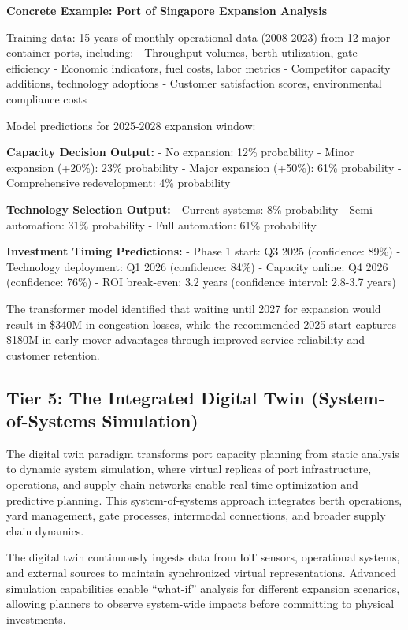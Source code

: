 \documentclass{article}
\begin{document}
\textbf{Concrete Example: Port of Singapore Expansion Analysis}

Training data: 15 years of monthly operational data (2008-2023) from 12 major container ports, including:
- Throughput volumes, berth utilization, gate efficiency
- Economic indicators, fuel costs, labor metrics  
- Competitor capacity additions, technology adoptions
- Customer satisfaction scores, environmental compliance costs

Model predictions for 2025-2028 expansion window:

\textbf{Capacity Decision Output:}
- No expansion: 12\% probability
- Minor expansion (+20\%): 23\% probability  
- Major expansion (+50\%): 61\% probability
- Comprehensive redevelopment: 4\% probability

\textbf{Technology Selection Output:}
- Current systems: 8\% probability
- Semi-automation: 31\% probability
- Full automation: 61\% probability

\textbf{Investment Timing Predictions:}
- Phase 1 start: Q3 2025 (confidence: 89\%)
- Technology deployment: Q1 2026 (confidence: 84\%)
- Capacity online: Q4 2026 (confidence: 76\%)
- ROI break-even: 3.2 years (confidence interval: 2.8-3.7 years)

The transformer model identified that waiting until 2027 for expansion would result in \$340M in congestion losses, while the recommended 2025 start captures \$180M in early-mover advantages through improved service reliability and customer retention.

\subsection{Tier 5: The Integrated Digital Twin (System-of-Systems Simulation)}

The digital twin paradigm transforms port capacity planning from static analysis to dynamic system simulation, where virtual replicas of port infrastructure, operations, and supply chain networks enable real-time optimization and predictive planning. This system-of-systems approach integrates berth operations, yard management, gate processes, intermodal connections, and broader supply chain dynamics.

The digital twin continuously ingests data from IoT sensors, operational systems, and external sources to maintain synchronized virtual representations. Advanced simulation capabilities enable ``what-if'' analysis for different expansion scenarios, allowing planners to observe system-wide impacts before committing to physical investments.
\end{document}
